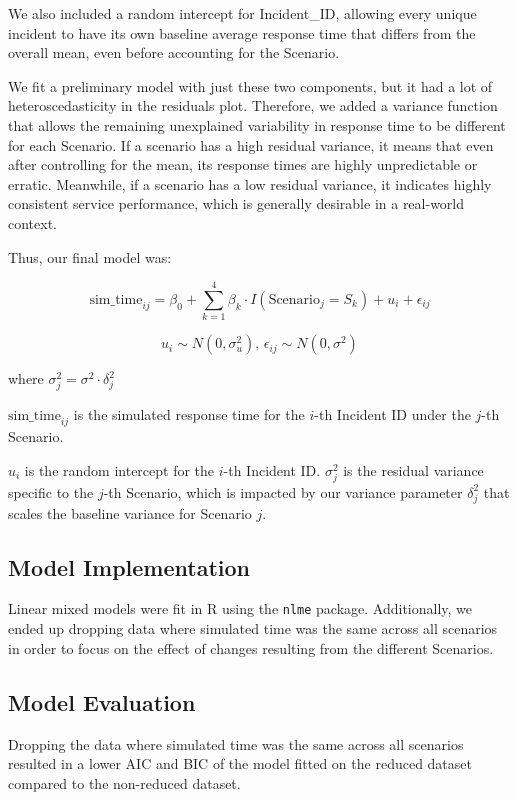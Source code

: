 \documentclass[
  11pt,
]{article}
\begin{document}
We also included a random intercept for Incident\_ID, allowing every
unique incident to have its own baseline average response time that
differs from the overall mean, even before accounting for the Scenario.

We fit a preliminary model with just these two components, but it had a
lot of heteroscedasticity in the residuals plot. Therefore, we added a
variance function that allows the remaining unexplained variability in
response time to be different for each Scenario. If a scenario has a
high residual variance, it means that even after controlling for the
mean, its response times are highly unpredictable or erratic. Meanwhile,
if a scenario has a low residual variance, it indicates highly
consistent service performance, which is generally desirable in a
real-world context.

Thus, our final model was:

\[\text{sim\_time}_{ij} = \beta_0 + \sum_{k=1}^4 \beta_k \cdot I(\text{Scenario}_j = S_k) + u_i + \epsilon_{ij} \]

\[
u_i \sim N(0, \sigma^2_u)\text{, }\epsilon_{ij} \sim N(0, \sigma^2)
\]

where \(\sigma^2_j = \sigma^2 \cdot\delta^2_j\)

\(\text{sim_time}_{ij}\) is the simulated response time for the \(i\)-th
Incident ID under the \(j\)-th Scenario.

\(u_i\) is the random intercept for the \(i\)-th Incident ID.
\(\sigma^2_j\) is the residual variance specific to the \(j\)-th
Scenario, which is impacted by our variance parameter \(\delta_j^2\)
that scales the baseline variance for Scenario \(j\).

\subsection{Model Implementation}\label{model-implementation}

Linear mixed models were fit in R using the \texttt{nlme} package.
Additionally, we ended up dropping data where simulated time was the
same across all scenarios in order to focus on the effect of changes
resulting from the different Scenarios.

\subsection{Model Evaluation}\label{model-evaluation}

Dropping the data where simulated time was the same across all scenarios
resulted in a lower AIC and BIC of the model fitted on the reduced
dataset compared to the non-reduced dataset.
\end{document}
